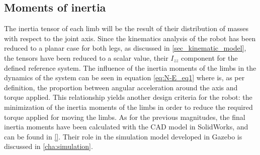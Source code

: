 

\subsection{Moments of inertia} %
\label{sub:moments_of_inertia}
The inertia tensor of each limb will be the result of their distribution of masses with respect to the joint axis.
Since the kinematics analysis of the robot has been reduced to a planar case for both legs, as discussed in \ref{sec_kinematic_model}, the tensors have been reduced to a scalar value, their $I_{zz}$ component for the defined reference system.
The influence of the inertia moments of the limbs in the dynamics of the system can be seen in equation \ref{eq:N-E_eq1} where is, as per definition, the proportion between angular acceleration around the axis and torque applied.
This relationship yields another design criteria for the robot: the minimization of the inertia moments of the limbs in order to reduce the required torque applied for moving the limbs.
As for the previous magnitudes, the final inertia moments have been calculated with the CAD model in SolidWorks, and can be found in \ref{}. 
Their role in the simulation model developed in Gazebo is discussed in \ref{cha:simulation}. 


